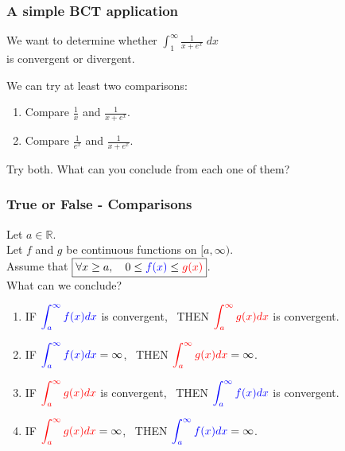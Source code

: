 \documentclass[14pt]{beamer}
\begin{document}
\begin{frame}[t]
	\fontsize{13}{13}\selectfont
	\frametitle{A simple BCT application}

	We want to determine whether $\displaystyle \int_{1}^{\infty}\frac{1}{x+e^{x}}\;
	dx$ \\ is convergent or divergent.

	We can try at least two comparisons:

	\begin{enumerate}
		\item Compare $\displaystyle \frac{1}{x}$ and $\displaystyle \frac{1}{x+ e^{x}}$.

		\item Compare $\displaystyle \frac{1}{e^{x}}$ and $\displaystyle \frac{1}{x+
			e^{x}}$.
	\end{enumerate}

	Try both. What can you conclude from each one of them?
\end{frame}

\begin{frame}[t]
	\fontsize{11}{11}\selectfont
	\frametitle{True or False - Comparisons}

	Let $a \in \mathbb{R}$. \\ Let $f$ and $g$ be continuous functions on
	$[a, \infty)$. \\ Assume that $\displaystyle \boxed{\forall x \geq a, \quad 0 \leq {\color{blue} f(x)} \leq {\color{red} g(x)}}$.
	\\ What can we conclude?

	\begin{enumerate}
		\item IF $\displaystyle{\color{blue} \int_a^{\infty} f(x) dx}$ is convergent,
			\, THEN $\displaystyle{\color{red} \int_a^{\infty} g(x) dx}$ is convergent.

		\item IF $\displaystyle{\color{blue} \int_a^{\infty} f(x) dx}= \infty$, \,
			THEN $\displaystyle{\color{red} \int_a^{\infty} g(x) dx}= \infty$.

		\item IF $\displaystyle{\color{red} \int_a^{\infty} g(x) dx}$ is convergent,
			\, THEN $\displaystyle{\color{blue} \int_a^{\infty} f(x) dx}$ is
			convergent.

		\item IF $\displaystyle{\color{red} \int_a^{\infty} g(x) dx}= \infty$, \,
			THEN $\displaystyle{\color{blue} \int_a^{\infty} f(x) dx}= \infty$.
	\end{enumerate}
\end{frame}
\end{document}
